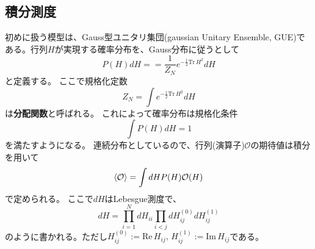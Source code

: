 \documentclass[10pt]{jsreport}
\theoremstyle{definition}%
\renewcommand{\Im}{\mathrm{Im\,}}
\renewcommand{\Re}{\mathrm{Re\,}}
\newcommand{\Tr}{\mathrm{Tr\,}}
\numberwithin{equation}{section}%
\begin{document}
\subsection{積分測度}
初めに扱う模型は、Gauss型ユニタリ集団(gaussian Unitary Ensemble, GUE)である。行列$H$が実現する確率分布を、Gauss分布に従うとして
\begin{equation}
  P(H)dH==\frac{1}{Z_{N}}e^{-\frac{1}{2}\Tr H^{2}}dH
\end{equation}
と定義する。
ここで規格化定数
\begin{equation}
  Z_{N}=\int e^{-\frac{1}{2}\Tr H^{2}}dH
\end{equation}
は{\bf 分配関数}と呼ばれる。
これによって確率分布は規格化条件
\begin{equation}
  \int P(H)dH=1
\end{equation}
を満たすようになる。
連続分布としているので、行列(演算子)$\mathcal{O}$の期待値は積分を用いて
\begin{equation}
  \braket{\mathcal{O}}=\int dH P(H)\mathcal{O}(H)
\end{equation}
で定められる。
ここで$dH$はLebesgue測度で、
\begin{equation}
  dH=\prod_{i=1}^{N}dH_{ii}\prod_{i< j}dH_{ij}^{(0)}dH_{ij}^{(1)}
\end{equation}
のように書かれる。ただし$H_{ij}^{(0)}:=\Re H_{ij},\, H_{ij}^{(1)}:=\Im H_{ij}$である。
\end{document}
